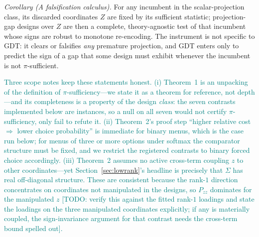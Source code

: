 \documentclass[journal]{IEEEtran}
\newcommand{\rev}[1]{\textcolor{teal}{#1}}
\begin{document}
\emph{Corollary (A falsification calculus).}
For any incumbent in the scalar-projection class, its discarded coordinates $Z$ are fixed by its sufficient statistic; projection-gap designs over $Z$ are then a complete, theory-agnostic test of that incumbent whose signs are robust to monotone re-encoding.
The instrument is not specific to GDT: it clears or falsifies \emph{any} premature projection, and GDT enters only to predict the sign of a gap that some design must exhibit whenever the incumbent is not $\pi$-sufficient.

\rev{Three scope notes keep these statements honest. (i) Theorem~1 is an unpacking of the definition of $\pi$-sufficiency---we state it as a theorem for reference, not depth---and its completeness is a property of the design \emph{class}: the seven contrasts implemented below are instances, so a null on all seven would not certify $\pi$-sufficiency, only fail to refute it. (ii) Theorem~2's proof step ``higher relative cost $\Rightarrow$ lower choice probability'' is immediate for binary menus, which is the case run below; for menus of three or more options under softmax the comparator structure must be fixed, and we restrict the registered contrasts to binary forced choice accordingly. (iii) Theorem~2 assumes no active cross-term coupling $z$ to other coordinates---yet Section~\ref{sec:lowrank}'s headline is precisely that $\Sigma$ has real off-diagonal structure. These are consistent because the rank-$1$ direction concentrates on coordinates not manipulated in the designs, so $P_{zz}$ dominates for the manipulated $z$ [TODO: verify this against the fitted rank-$1$ loadings and state the loadings on the three manipulated coordinates explicitly; if any is materially coupled, the sign-invariance argument for that contrast needs the cross-term bound spelled out].}
\end{document}
